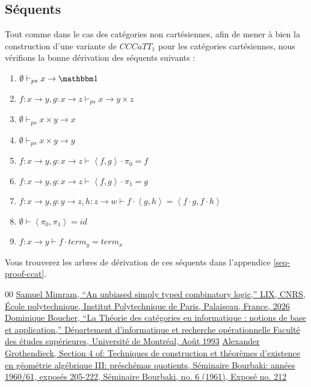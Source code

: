 \documentclass[conference]{IEEEtran}
\begin{document}
	\subsection{Séquents}
	Tout comme dans le cas des catégories non cartésiennes, afin de mener à bien la construction d'une variante de $CCCaTT_1$ pour les catégories cartésiennes, nous vérifions la bonne dérivation des séquents suivants :
	
	\begin{enumerate}
		\item $\emptyset \vdash_{ps} x \rightarrow \mathbbm 1$
		\item $f : x \rightarrow y, g : x \rightarrow z \vdash_{ps} x \rightarrow y \times z$
		\item $\emptyset \vdash_{ps} x \times y \rightarrow x$
		\item $\emptyset \vdash_{ps} x \times y \rightarrow y$
		
		\item $f : x \rightarrow y, g : x \rightarrow z \vdash \left<f, g\right> \cdot \pi_0 = f$
		\item $f : x \rightarrow y, g : x \rightarrow z \vdash \left<f, g\right> \cdot \pi_1 = g$
		\item $f : x \rightarrow y, g : y \rightarrow z, h : z \rightarrow w \vdash f \cdot \left<g, h\right> = \left< f \cdot g, f \cdot h\right>$
		\item $\emptyset \vdash \left<\pi_0, \pi_1\right> = id$
		\item $f : x \rightarrow y \vdash f \cdot term_y = term_x$
	\end{enumerate}
	
	Vous trouverez les arbres de dérivation de ces séquents dans l'appendice \ref{seq-proof-ccat}.	
	
	\begin{thebibliography}{00}
		 \href{https://www.lix.polytechnique.fr/Labo/Samuel.Mimram/docs/mimram_cccatt.pdf}
		{Samuel Mimram, ``An unbiased simply typed combinatory logic,'' LIX, CNRS, École polytechnique, Institut Polytechnique de Paris, Palaiseau, France, 2026}
		 \href{https://umontreal.scholaris.ca/items/f2d7e64e-fc35-4149-ad60-113a22d4011a}
		{Dominique Boucher, ``La Théorie des catégories en informatique :
		notions de base et application,'' Département d'informatique et recherche opérationnelle
		Faculté des études supérieures, Université de Montréal, Août 1993}
		 \href{https://www.numdam.org/item/?id=SB_1960-1961__6__99_0}
		{Alexander Grothendieck, Section 4 of: Techniques de construction et théorèmes d’existence en géométrie algébrique III: préschémas quotients, Séminaire Bourbaki: années 1960/61, exposés 205-222, Séminaire Bourbaki, no. 6 (1961), Exposé no. 212}
	\end{thebibliography}
	
\end{document}
